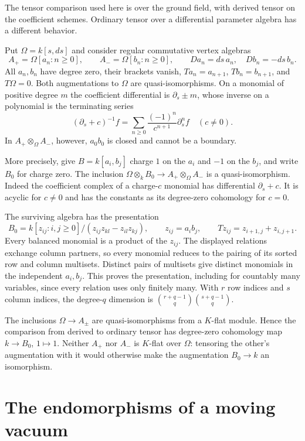 The tensor comparison used here is over the ground field, with
derived tensor on the coefficient schemes. Ordinary tensor over
a differential parameter algebra has a different behavior.

\begin{example}\label{cbc:rc:parameter-tensor}
Put $\Omega=k[s,ds]$ and consider regular commutative vertex
algebras
\[
 A_+=\Omega[a_n:n\geq0],\qquad A_-=\Omega[b_n:n\geq0],
 \qquad Da_n=ds\,a_n,
 \quad Db_n=-ds\,b_n.
\]
All $a_n,b_n$ have degree zero, their brackets vanish,
$Ta_n=a_{n+1}$, $Tb_n=b_{n+1}$, and $T\Omega=0$.
Both augmentations to $\Omega$ are quasi-isomorphisms.
On a monomial of positive degree $m$ the coefficient
differential is $\partial_s\pm m$, whose inverse on a
polynomial is the terminating series
\[
 (\partial_s+c)^{-1}f
   =\sum_{n\geq0}\frac{(-1)^n}{c^{n+1}}\partial_s^nf
   \quad(c\ne0).
\]
In $A_+\otimes_\Omega A_-$, however, $a_0b_0$ is closed
and cannot be a boundary.

More precisely, give $B=k[a_i,b_j]$ charge $1$ on the $a_i$
and $-1$ on the $b_j$, and write $B_0$ for charge zero.
The inclusion $\Omega\otimes_k B_0\to A_+\otimes_\Omega A_-$
is a quasi-isomorphism. Indeed the coefficient complex of a
charge-$c$ monomial has differential $\partial_s+c$.
It is acyclic for $c\ne0$ and has the constants as its
degree-zero cohomology for $c=0$.

The surviving algebra has the presentation
\[
 B_0=k[z_{ij}:i,j\geq0]/(z_{ij}z_{kl}-z_{il}z_{kj}),
 \qquad z_{ij}=a_ib_j,
 \qquad Tz_{ij}=z_{i+1,j}+z_{i,j+1}.
\]
Every balanced monomial is a product of the $z_{ij}$.
The displayed relations exchange column partners, so every
monomial reduces to the pairing of its sorted row and column
multisets. Distinct pairs of multisets give distinct monomials
in the independent $a_i,b_j$. This proves the presentation,
including for countably many variables, since every relation
uses only finitely many. With $r$ row indices and $s$ column
indices, the degree-$q$ dimension is
$\binom{r+q-1}{q}\binom{s+q-1}{q}$.

The inclusions $\Omega\to A_\pm$ are quasi-isomorphisms from
a $K$-flat module. Hence the comparison from derived to
ordinary tensor has degree-zero cohomology map $k\to B_0$,
$1\mapsto1$. Neither $A_+$ nor $A_-$ is $K$-flat over
$\Omega$: tensoring the other's augmentation with it would
otherwise make the augmentation $B_0\to k$ an isomorphism.
\end{example}

\section{The endomorphisms of a moving vacuum}
\label{cbc:rc:moving-vacuum}

